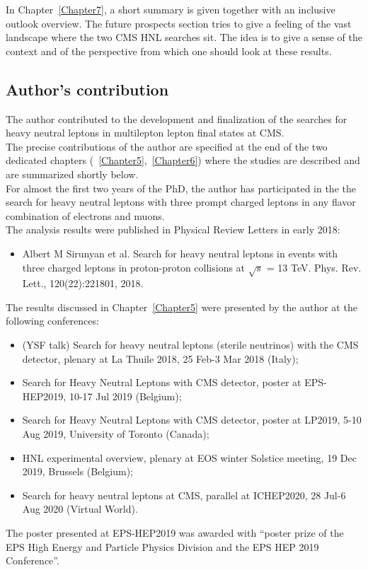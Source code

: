 In Chapter~\ref{Chapter7}, a short summary is given together with an
inclusive outlook overview. The future prospects section tries to give a feeling of the vast landscape
where the two CMS HNL searches sit. The idea is to give a sense of the
context and of the perspective from which one should look at these results.

\subsection*{Author's contribution}

The author contributed to the development and finalization of the
searches for heavy neutral leptons in multilepton lepton final
states at CMS.\\
The precise contributions of the author are specified at
the end of the two dedicated chapters
(~\ref{Chapter5},~\ref{Chapter6}) where the studies are described
and are summarized shortly below.\\

For almost the first two years of the PhD, the author
has participated in the the search for heavy neutral leptons with three
prompt charged leptons in any flavor combination of electrons and
muons. \\
The analysis
results were published in Physical Review Letters in early 2018:
\begin{itemize}
\setlength\itemsep{-0.1em}
\item Albert M Sirunyan et al. Search for heavy neutral leptons in events with three charged leptons
in proton-proton collisions at $\sqrt{s}$ = 13 TeV. Phys. Rev. Lett., 120(22):221801, 2018.
\end{itemize}

The results discussed in Chapter~\ref{Chapter5} were presented by the author at the following
conferences:
\begin{itemize}
\setlength\itemsep{-0.1em}
\item (YSF talk) Search for heavy neutral leptons (sterile
  neutrinos) with the CMS detector, plenary at La Thuile 2018, 25
  Feb-3 Mar 2018 (Italy);
\item Search for Heavy Neutral Leptons with CMS detector, poster at
  EPS-HEP2019, 10-17 Jul 2019 (Belgium);
\item Search for Heavy Neutral Leptons with CMS detector, poster at
  LP2019, 5-10 Aug 2019, University of Toronto (Canada);
\item HNL experimental overview, plenary at EOS winter Solstice
  meeting, 19 Dec 2019, Brussels (Belgium);
\item  Search for heavy neutral leptons at CMS, parallel at
  ICHEP2020, 28 Jul-6 Aug 2020 (Virtual World).
\end{itemize}
The poster presented at EPS-HEP2019 was awarded with ``poster prize of
the EPS High Energy and Particle Physics Division and the EPS HEP 2019
Conference''.\\
 

